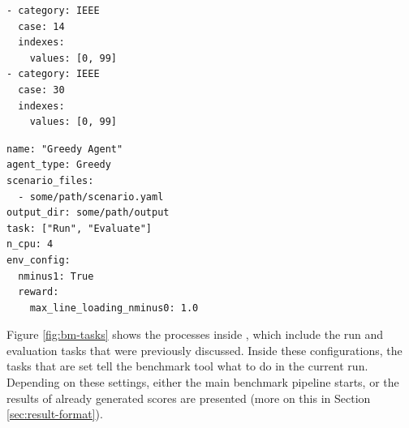 \begin{listing}[htp]
\centering
\footnotesize
\begin{minipage}{0.85\textwidth}
    \begin{minipage}[t]{0.32\textwidth}
    \begin{verbatim}
- category: IEEE
  case: 14
  indexes:
    values: [0, 99]
- category: IEEE
  case: 30
  indexes:
    values: [0, 99]
    \end{verbatim}
    \end{minipage}
    \hspace{0.1\textwidth}
    \begin{minipage}[t]{0.47\textwidth}
    \begin{verbatim}
name: "Greedy Agent"
agent_type: Greedy
scenario_files:
  - some/path/scenario.yaml
output_dir: some/path/output
task: ["Run", "Evaluate"]
n_cpu: 4
env_config:
  nminus1: True
  reward:
    max_line_loading_nminus0: 1.0
    \end{verbatim}
    \end{minipage}
\end{minipage}
\caption{Example YAML files for the benchmark settings: scenario (left) and main configuration (right)}
\label{lst:yaml-configs}
\end{listing}

Figure \ref{fig:bm-tasks} shows the processes inside \benchmark, which include the run and evaluation tasks that were previously discussed. Inside these configurations, the tasks that are set tell the benchmark tool what to do in the current run. Depending on these settings, either the main benchmark pipeline starts, or the results of already generated scores are presented (more on this in Section \ref{sec:result-format}). 

